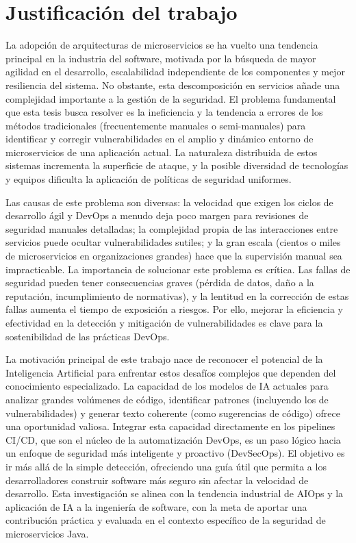 \section{Justificación del trabajo}\label{sec:justificaciontrabajo}
La adopción de arquitecturas de microservicios se ha vuelto una tendencia principal en la industria del software, motivada por la búsqueda de mayor agilidad en el desarrollo, escalabilidad independiente de los componentes y mejor resiliencia del sistema. No obstante, esta descomposición en servicios añade una complejidad importante a la gestión de la seguridad. El problema fundamental que esta tesis busca resolver es la ineficiencia y la tendencia a errores de los métodos tradicionales (frecuentemente manuales o semi-manuales) para identificar y corregir vulnerabilidades en el amplio y dinámico entorno de microservicios de una aplicación actual. La naturaleza distribuida de estos sistemas incrementa la superficie de ataque, y la posible diversidad de tecnologías y equipos dificulta la aplicación de políticas de seguridad uniformes.

Las causas de este problema son diversas: la velocidad que exigen los ciclos de desarrollo ágil y DevOps a menudo deja poco margen para revisiones de seguridad manuales detalladas; la complejidad propia de las interacciones entre servicios puede ocultar vulnerabilidades sutiles; y la gran escala (cientos o miles de microservicios en organizaciones grandes) hace que la supervisión manual sea impracticable. La importancia de solucionar este problema es crítica. Las fallas de seguridad pueden tener consecuencias graves (pérdida de datos, daño a la reputación, incumplimiento de normativas), y la lentitud en la corrección de estas fallas aumenta el tiempo de exposición a riesgos. Por ello, mejorar la eficiencia y efectividad en la detección y mitigación de vulnerabilidades es clave para la sostenibilidad de las prácticas DevOps.

La motivación principal de este trabajo nace de reconocer el potencial de la Inteligencia Artificial para enfrentar estos desafíos complejos que dependen del conocimiento especializado. La capacidad de los modelos de IA actuales para analizar grandes volúmenes de código, identificar patrones (incluyendo los de vulnerabilidades) y generar texto coherente (como sugerencias de código) ofrece una oportunidad valiosa. Integrar esta capacidad directamente en los pipelines CI/CD, que son el núcleo de la automatización DevOps, es un paso lógico hacia un enfoque de seguridad más inteligente y proactivo (DevSecOps). El objetivo es ir más allá de la simple detección, ofreciendo una guía útil que permita a los desarrolladores construir software más seguro sin afectar la velocidad de desarrollo. Esta investigación se alinea con la tendencia industrial de AIOps y la aplicación de IA a la ingeniería de software, con la meta de aportar una contribución práctica y evaluada en el contexto específico de la seguridad de microservicios Java.

